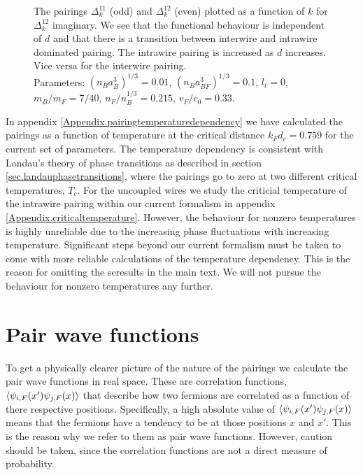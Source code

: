 \begin{figure} 
\begin{center}  
  
\caption{The pairings $\Delta^{11}_k$ (odd) and $\Delta^{12}_k$ (even) plotted as a function of $k$ for $\Delta^{12}_k$ imaginary. We see that the functional behaviour is independent of $d$ and that there is a transition between interwire and intrawire dominated pairing. The intrawire pairing is increased as $d$ increases. Vice versa for the interwire pairing. \\
Parameters: $(n_Ba_B^3)^{1/3} = 0.01$, $(n_Ba_{BF}^3)^{1/3} = 0.1$, $l_t = 0$, $m_B / m_F = 7/40$, $n_F / n_B^{1/3} = 0.215$, $v_F / c_0 = 0.33$. }  
\label{fig.pairingkdependT0dvaried}  
\end{center}    
\end{figure}

In appendix \ref{Appendix.pairingtemperaturedependency} we have calculated the pairings as a function of temperature at the critical distance $k_Fd_c = 0.759$ for the current set of parameters. The temperature dependency is consistent with Landau's theory of phase transitions as described in section \ref{sec.landauphasetransitions}, where the pairings go to zero at two different critical temperatures, $T_c$. For the uncoupled wires we study the criticial temperature of the intrawire pairing within our current formalism in appendix \ref{Appendix.criticaltemperature}. However, the behaviour for nonzero temperatures is highly unreliable due to the increasing phase fluctuations with increasing temperature. Significant steps beyond our current formalism must be taken to come with more reliable calculations of the temperature dependency. This is the reason for omitting the seresults in the main text. We will not pursue the behaviour for nonzero temperatures any further.


\section{Pair wave functions} \label{sec.pairwavefunctions}
To get a physically clearer picture of the nature of the pairings we calculate the pair wave functions in real space. These are correlation functions, $\braket{\psi_{i,F}(x')\psi_{j,F}(x)}$ that describe how two fermions are correlated as a function of there respective positions. Specifically, a high absolute value of $\braket{\psi_{i,F}(x')\psi_{j,F}(x)}$ means that the fermions have a tendency to be at those positions $x$ and $x'$. This is the reason why we refer to them as pair wave functions. However, caution should be taken, since the correlation functions are not a direct measure of probability. 

